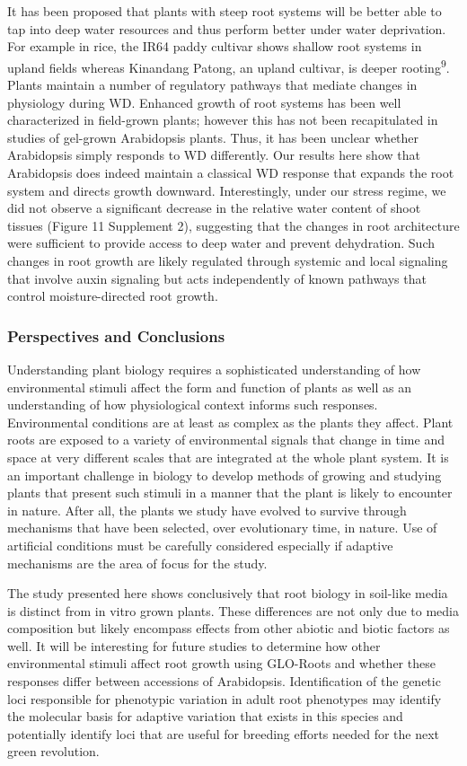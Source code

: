 \documentclass[]{article}
\begin{document}
It has been proposed that plants with steep root systems will be better
able to tap into deep water resources and thus perform better under
water deprivation. For example in rice, the IR64 paddy cultivar shows
shallow root systems in upland fields whereas Kinandang Patong, an
upland cultivar, is deeper rooting\textsuperscript{9}. Plants maintain a
number of regulatory pathways that mediate changes in physiology during
WD. Enhanced growth of root systems has been well characterized in
field-grown plants; however this has not been recapitulated in studies
of gel-grown Arabidopsis plants. Thus, it has been unclear whether
Arabidopsis simply responds to WD differently. Our results here show
that Arabidopsis does indeed maintain a classical WD response that
expands the root system and directs growth downward. Interestingly,
under our stress regime, we did not observe a significant decrease in
the relative water content of shoot tissues (Figure 11 Supplement 2),
suggesting that the changes in root architecture were sufficient to
provide access to deep water and prevent dehydration. Such changes in
root growth are likely regulated through systemic and local signaling
that involve auxin signaling but acts independently of known pathways
that control moisture-directed root growth.

\subsubsection{Perspectives and
Conclusions}\label{perspectives-and-conclusions}

Understanding plant biology requires a sophisticated understanding of
how environmental stimuli affect the form and function of plants as well
as an understanding of how physiological context informs such responses.
Environmental conditions are at least as complex as the plants they
affect. Plant roots are exposed to a variety of environmental signals
that change in time and space at very different scales that are
integrated at the whole plant system. It is an important challenge in
biology to develop methods of growing and studying plants that present
such stimuli in a manner that the plant is likely to encounter in
nature. After all, the plants we study have evolved to survive through
mechanisms that have been selected, over evolutionary time, in nature.
Use of artificial conditions must be carefully considered especially if
adaptive mechanisms are the area of focus for the study.

The study presented here shows conclusively that root biology in
soil-like media is distinct from in vitro grown plants. These
differences are not only due to media composition but likely encompass
effects from other abiotic and biotic factors as well. It will be
interesting for future studies to determine how other environmental
stimuli affect root growth using GLO-Roots and whether these responses
differ between accessions of Arabidopsis. Identification of the genetic
loci responsible for phenotypic variation in adult root phenotypes may
identify the molecular basis for adaptive variation that exists in this
species and potentially identify loci that are useful for breeding
efforts needed for the next green revolution.
\end{document}
